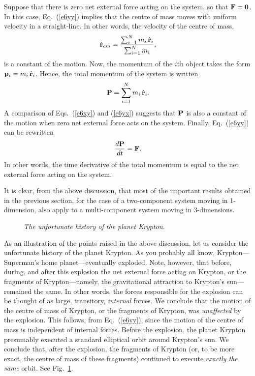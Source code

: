 Suppose that there is zero net external force acting on the system, so that ${\bf F} = {\bf 0}$. 
In this case, Eq.~(\ref{e6yy}) implies that the centre of mass moves with  uniform
velocity in a straight-line. In other words, the velocity of the centre of mass,
\begin{equation}\label{e6xy}
\dot{\bf r}_{cm} = \frac{\sum_{i=1}^N m_i\,\dot{\bf r}_i}{\sum_{i=1}^N m_i},
\end{equation}
is a constant of the motion. Now, the momentum of the $i$th object takes the
form ${\bf p}_i = m_i\,\dot{\bf r}_i$. Hence, the total momentum of the
system is written
\begin{equation}\label{e6yx}
{\bf P} = \sum_{i=1}^N m_i\,\dot{\bf r}_i.
\end{equation}
A comparison of Eqs.~(\ref{e6xy}) and (\ref{e6yx}) suggests that ${\bf P}$ is also
a constant of the motion when zero net external force acts on the system. Finally, 
Eq.~(\ref{e6yy}) can be rewritten
\begin{equation}
\frac{d{\bf P}}{dt} = {\bf F}.
\end{equation}
In other words, the time derivative of the total momentum
is equal to the net external force acting on the system.

It is clear, from the above discussion, that most of the important results obtained in the
previous section, for the case of a two-component system moving
in 1-dimension, also apply to a multi-component system moving in 3-dimensions.

\begin{figure}
\epsfysize=2in
\centerline{}
\caption{\em The unfortunate history of the planet Krypton.}\label{f50}  
\end{figure}

As an illustration of the points raised in the above discussion, let us consider the unfortunate
history of the planet Krypton. As you probably all know, Krypton---Superman's home planet---eventually
 exploded. 
Note, however, that before, during, and after this explosion the net external force acting
on Krypton, or the fragments of Krypton---namely, the gravitational attraction to Krypton's sun---remained
the same. In other words, the forces responsible for the explosion can be thought of as
large, transitory, {\em internal} forces. We conclude that  the motion of the centre of mass of
Krypton, or the fragments of Krypton, was {\em unaffected} by the explosion. This follows, from
Eq.~(\ref{e6yy}), since the motion of the centre of mass is independent of internal forces. 
Before the explosion, the planet Krypton presumably executed a standard elliptical orbit
around Krypton's sun. We conclude that,
 after the explosion, the fragments of Krypton (or, to be more exact, the
centre of mass of these fragments) continued to execute {\em exactly the same} orbit. See
Fig.~\ref{f50}.

